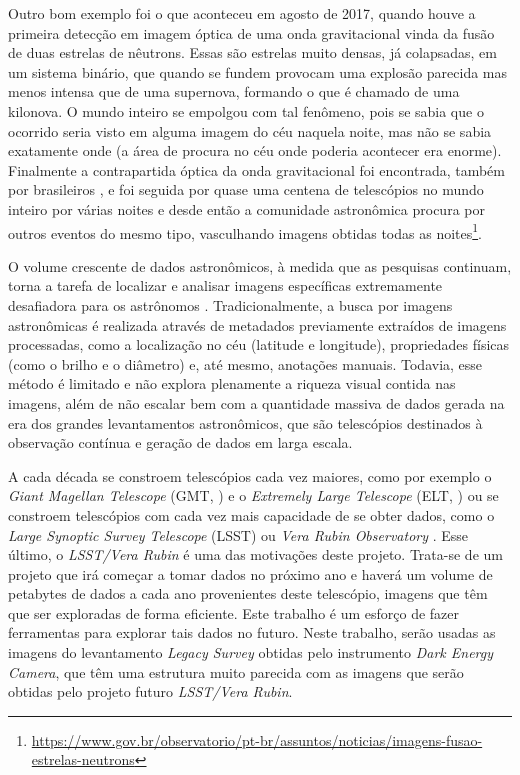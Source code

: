 \documentclass[a4,12pt]{horizon-theme}
\begin{document}
Outro bom exemplo foi o que aconteceu em agosto de 2017, quando houve a primeira detecção em imagem óptica de uma onda gravitacional vinda da fusão de duas estrelas de nêutrons. Essas são estrelas muito densas, já colapsadas, em um sistema binário, que quando se fundem provocam uma explosão parecida mas menos intensa que de uma supernova, formando o que é chamado de uma kilonova. O mundo inteiro se empolgou com tal fenômeno, pois se sabia que o ocorrido seria visto em alguma imagem do céu naquela noite, mas não se sabia exatamente onde (a área de procura no céu onde poderia acontecer era enorme). Finalmente a contrapartida óptica da onda gravitacional foi encontrada, também por brasileiros \citep{estrela_neutrons}, e foi seguida por quase uma centena de telescópios no mundo inteiro por várias noites e desde então a comunidade astronômica procura por outros eventos do mesmo tipo, vasculhando imagens obtidas todas as noites\footnote{\url{https://www.gov.br/observatorio/pt-br/assuntos/noticias/imagens-fusao-estrelas-neutrons}}.

O volume crescente de dados astronômicos, à medida que as pesquisas continuam, torna a tarefa de localizar e analisar imagens específicas extremamente desafiadora para os astrônomos \citep{astronomy_bigdata_challenges}. Tradicionalmente, a busca por imagens astronômicas é realizada através de metadados previamente extraídos de imagens processadas, como a localização no céu (latitude e longitude), propriedades físicas (como o brilho e o diâmetro) e, até mesmo, anotações manuais. Todavia, esse método é limitado e não explora plenamente a riqueza visual contida nas imagens, além de não escalar bem com a quantidade massiva de dados gerada na era dos grandes levantamentos astronômicos, que são telescópios destinados à observação contínua e geração de dados em larga escala.

A cada década se constroem telescópios cada vez maiores, como por exemplo o \emph{Giant Magellan Telescope} (GMT, \cite{gmt}) e o \emph{Extremely Large Telescope} (ELT, \cite{elt}) ou se constroem telescópios com cada vez mais capacidade de se obter dados, como o \emph{Large Synoptic Survey Telescope} (LSST) ou \emph{Vera Rubin Observatory} \citep{lsst}. Esse último, o \emph{LSST/Vera Rubin} é uma das motivações deste projeto. Trata-se de um projeto que irá começar a tomar dados no próximo ano e haverá um volume de petabytes de dados a cada ano provenientes deste telescópio, imagens que têm que ser exploradas de forma eficiente. Este trabalho é um esforço de fazer ferramentas para explorar tais dados no futuro. Neste trabalho, serão usadas as imagens do levantamento \emph{Legacy Survey} \citep{legacy} obtidas pelo instrumento \emph{Dark Energy Camera}, que têm uma estrutura muito parecida com as imagens que serão obtidas pelo projeto futuro \emph{LSST/Vera Rubin}.
\end{document}
